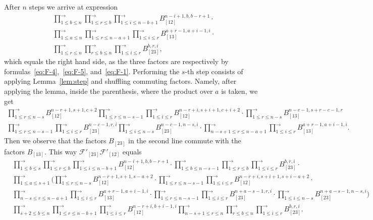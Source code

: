 \documentclass[11pt, reqno]{amsart}
\theoremstyle{definition}
\numberwithin{equation}{section}
\def\longra{\longrightarrow}
\def\le{\leqslant}
\def\Fc{\mathcal F'}
\begin{document}
After $n$ steps we arrive at expression
\begin{align*}
&\prod_{1 \le b \le n}^{\longra} \prod_{1 \le r \le b}^{\longra} \prod_{1 \le i \le n-b+1}^{\longra} B_{[12]}^{n-i+1,b,b-r+1} \cdot \\
&\prod_{1\le a \le n}^{\longra} \prod_{1 \le r \le n-a+1}^{\longra} \prod_{1 \le i \le r}^{\longra} B_{[13]}^{a+r-1,a+i-1,i} \cdot \\
&\prod_{1 \le r \le n}^{\longra} \prod_{r \le b \le n}^{\longra} \prod_{1 \le i \le r}^{\longra} B_{[23]}^{b,r,i},
\end{align*}
which equals the right hand side, as the three factors are respectively by formulas~\eqref{eq:F-4},~\eqref{eq:F-5}, and~\eqref{eq:F-1}. Performing the $s$-th step consists of applying Lemma~\ref{lem:step} and shuffling commuting factors. Namely, after applying the lemma, inside the parenthesis, where the product over $a$ is taken, we get
\begin{align*}
\prod_{1 \le r \le n-s}^{\longra} B_{[12]}^{n-r+1,s+1,c+2} \prod_{1 \le r \le n-s-1}^{\longra} \prod_{1 \le i \le r}^{\longra} B_{[12]}^{n-r+i,s+i+1,c+i+2} \cdot \prod_{1 \le r \le n-s}^{\longra} B_{[13]}^{n-c-1,s+r-c-1,r} \\
\prod_{1 \le r \le n-s-1}^{\longra} \prod_{1 \le i \le r}^{\longra} B_{[23]}^{n-c-1,r,i} \prod_{1 \le i \le n-s}^{\longra}B_{[23]}^{n-c-1,n-s,i} \cdot \prod_{n-s+1 \le r \le n-a+1}^{\longra} \prod_{1 \le i \le r}^{\longra} B_{[13]}^{a+r-1,a+i-1,i}.
\end{align*}
Then we observe that the factors $B_{[23]}$ in the second line commute with the factors $B_{[13]}$. This way $\Fc_{[23]}\Fc_{[12]}$ equals
\begin{align*}
&\prod_{1 \le b \le s}^{\longra} \prod_{1 \le r \le b}^{\longra} \prod_{1 \le i \le n-b+1}^{\longra} B_{[12]}^{n-i+1,b,b-r+1} \cdot \prod_{1 \le b \le n-s-1}^{\longra} \prod_{1 \le r \le b}^{\longra} \prod_{1 \le i \le r}^{\longra} B_{[23]}^{b,r,i} \cdot \\
&\prod_{1\le a \le s+1}^{\longra} \Bigg( \prod_{1 \le r \le n-s}^{\longra} B_{[12]}^{n-r+1,s+1,s-a+2} \cdot \prod_{1 \le r \le n-s-1}^{\longra} \prod_{1 \le i \le r}^{\longra} B_{[12]}^{n-r+i,s+i+1,s+i-a+2} \cdot \\
&\prod_{n-s \le r \le n-a+1}^{\longra} \prod_{1 \le i \le r}^{\longra} B_{[13]}^{a+r-1,a+i-1,i} \cdot \prod_{1 \le r \le n-s-1}^{\longra} \prod_{1 \le i \le r}^{\longra} B_{[23]}^{n+a-s-1,r,i} \cdot \prod_{1 \le i \le n-s}^{\longra} B_{[23]}^{n+a-s-1,n-s,i}\Bigg) \\
&\prod_{s+2 \le b \le n}^{\longra} \prod_{1 \le r \le n-b+1}^{\longra} \prod_{1 \le i \le r}^{\longra} B_{[12]}^{n-r+i,b+i-1,i} \prod_{n-s+1 \le r \le n}^{\longra} \prod_{r \le b \le n}^{\longra} \prod_{1 \le i \le r}^{\longra} B_{[23]}^{b,r,i}.
\end{align*}
\end{document}
